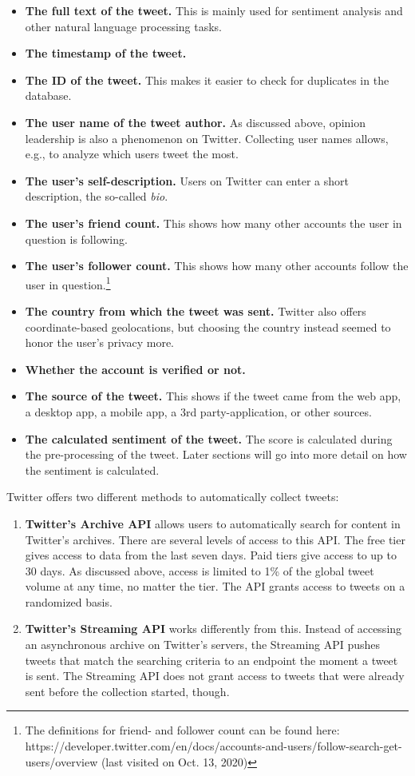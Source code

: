 \begin{itemize}
\item \textbf{The full text of the tweet.} This is mainly used for sentiment analysis and other natural language processing tasks.
\item \textbf{The timestamp of the tweet.}
\item \textbf{The ID of the tweet.} This makes it easier to check for duplicates in the database. 
\item \textbf{The user name of the tweet author.} As discussed above, opinion leadership is also a phenomenon on Twitter. Collecting user names allows, e.g., to analyze which users tweet the most.
\item \textbf{The user's self-description.} Users on Twitter can enter a short description, the so-called \emph{bio}.
\item \textbf{The user's friend count.} This shows how many other accounts the user in question is following.
\item \textbf{The user's follower count.} This shows how many other accounts follow the user in question.\footnote{The definitions for friend- and follower count can be found here: https://developer.twitter.com/en/docs/accounts-and-users/follow-search-get-users/overview (last visited on Oct. 13, 2020)}
\item \textbf{The country from which the tweet was sent.} Twitter also offers coordinate-based geolocations, but choosing the country instead seemed to honor the user's privacy more.
\item \textbf{Whether the account is verified or not.}
\item \textbf{The source of the tweet.} This shows if the tweet came from the web app, a desktop app, a mobile app, a 3rd party-application, or other sources.
\item \textbf{The calculated sentiment of the tweet.} The score is calculated during the pre-processing of the tweet. Later sections will go into more detail on how the sentiment is calculated.
\end{itemize}


Twitter offers two different methods to automatically collect tweets:
\begin{enumerate}
    \item \textbf{Twitter's Archive API} allows users to automatically search for content in Twitter's archives. There are several levels of access to this API. The free tier gives access to data from the last seven days. Paid tiers give access to up to 30 days. As discussed above, access is limited to 1\% of the global tweet volume at any time, no matter the tier. The API grants access to tweets on a randomized basis.
    \item \textbf{Twitter's Streaming API} works differently from this. Instead of accessing an asynchronous archive on Twitter's servers, the Streaming API pushes tweets that match the searching criteria to an endpoint the moment a tweet is sent. The Streaming API does not grant access to tweets that were already sent before the collection started, though.
\end{enumerate}

